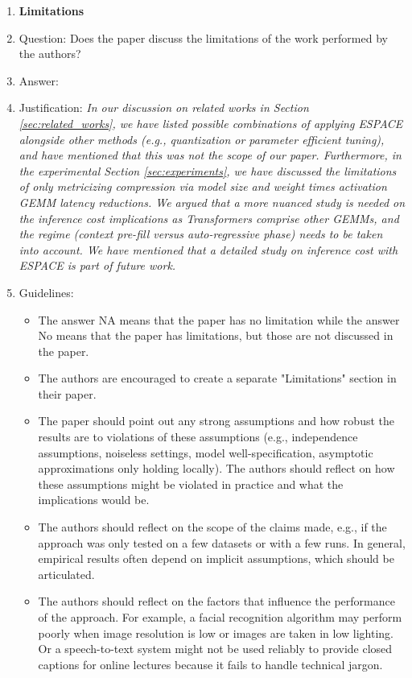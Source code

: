 \documentclass{article}
\theoremstyle{plain}
\begin{document}
\begin{enumerate}
\item {\bf Limitations}
    \item[] Question: Does the paper discuss the limitations of the work performed by the authors?
    \item[] Answer: \answerYes %
    \item[] Justification: \textit{In our discussion on related works in Section \ref{sec:related_works}, we have listed possible combinations of applying ESPACE alongside other methods (e.g., quantization or parameter efficient tuning), and have mentioned that this was not the scope of our paper. Furthermore, in the experimental Section \ref{sec:experiments}, we have discussed the limitations of only metricizing compression via model size and weight times activation GEMM latency reductions. We argued that a more nuanced study is needed on the inference cost implications as Transformers comprise other GEMMs, and the regime (context pre-fill versus auto-regressive phase) needs to be taken into account. We have mentioned that a detailed study on inference cost with ESPACE is part of future work.}
    \item[] Guidelines:
    \begin{itemize}
        \item The answer NA means that the paper has no limitation while the answer No means that the paper has limitations, but those are not discussed in the paper. 
        \item The authors are encouraged to create a separate "Limitations" section in their paper.
        \item The paper should point out any strong assumptions and how robust the results are to violations of these assumptions (e.g., independence assumptions, noiseless settings, model well-specification, asymptotic approximations only holding locally). The authors should reflect on how these assumptions might be violated in practice and what the implications would be.
        \item The authors should reflect on the scope of the claims made, e.g., if the approach was only tested on a few datasets or with a few runs. In general, empirical results often depend on implicit assumptions, which should be articulated.
        \item The authors should reflect on the factors that influence the performance of the approach. For example, a facial recognition algorithm may perform poorly when image resolution is low or images are taken in low lighting. Or a speech-to-text system might not be used reliably to provide closed captions for online lectures because it fails to handle technical jargon.

\end{itemize}
\end{enumerate}
\end{document}
